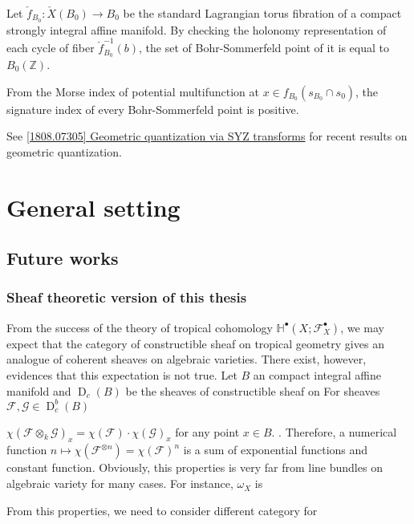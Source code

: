 \documentclass[a4paper,dvipdfmx,reqno,12pt]{amsart}
\theoremstyle{definition}
\newcommand{\Z}{\mathbb{Z}}%
\newcommand{\mb}[1]{\mathbb{#1}}%
\newcommand{\mcal}[1]{\mathcal{#1}}%
\newcommand{\opn}[1]{\operatorname{#1}}
\numberwithin{equation}{section}
\begin{document}
Let $\check{f}_{B_0}:\check{X}(B_0)\to B_0$ be the standard Lagrangian torus fibration of a compact strongly integral affine manifold. By checking the holonomy representation of each cycle of fiber $\check{f}_{B_0}^{-1}(b)$,
the set of Bohr-Sommerfeld point of it is equal to $B_0(\Z)$.

From the Morse index of potential multifunction at 
$x\in f_{B_0}(s_{B_0}\cap s_0)$, the signature 
index of every Bohr-Sommerfeld point is positive.

See
\href{https://arxiv.org/abs/1808.07305}{[1808.07305] Geometric quantization via SYZ transforms} for recent results on geometric quantization.


\section{General setting}







\subsection{Future works}

\subsubsection{Sheaf theoretic version of this thesis}

From the success of the theory of tropical cohomology
$\mb{H}^{\bullet}(X;\mcal{F}_X^{\bullet})$,
we may expect that the category of constructible sheaf
on tropical geometry gives an analogue of coherent
sheaves on algebraic varieties.
There exist, however, evidences that
this expectation is not true.
Let $B$ an compact integral affine manifold and
$\opn{D}_c(B)$ be the sheaves of constructible sheaf
on
For sheaves $\mcal{F},\mcal{G}\in \opn{D}_{c}^{b}(B)$

$\chi(\mcal{F}\otimes_k \mcal{G})_x
  =\chi(\mcal{F})\cdot \chi(\mcal{G})_x$ for any point
$x\in B$.
\cite[(9.7.2)]{MR1299726}.
Therefore, a numerical function
$n\mapsto \chi(\mcal{F}^{\otimes n})=\chi(\mcal{F})^{n}$
is a sum of exponential functions and constant function.
Obviously, this properties is very far
from line bundles on algebraic variety for many cases.
For instance, $\omega_X$ is

From this properties, we need to consider different category
for

  
\end{document}
